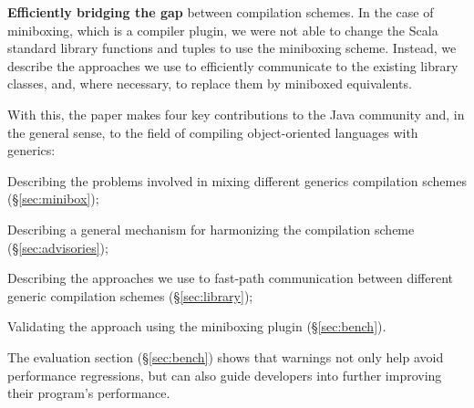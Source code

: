 \textbf{Efficiently bridging the gap} between compilation schemes. In the case of miniboxing, which is a compiler plugin, we were not able to change the Scala standard library functions and tuples to use the miniboxing scheme. Instead, we describe the approaches we use to efficiently communicate to the existing library classes, and, where necessary, to replace them by miniboxed equivalents.

With this, the paper makes four key contributions to the Java community and, in the general sense, to the field of compiling object-oriented languages with generics:

\begin{compactitem}
  \item Describing the problems involved in mixing different generics compilation schemes (\S\ref{sec:minibox});
  \item Describing a general mechanism for harmonizing the compilation scheme (\S\ref{sec:advisories});
  \item Describing the approaches we use to fast-path communication between different generic compilation schemes (\S\ref{sec:library});
  \item Validating the approach using the miniboxing plugin (\S\ref{sec:bench}).
\end{compactitem}

The evaluation section (\S\ref{sec:bench}) shows that warnings not only help avoid performance regressions, but can also guide developers into further improving their program's performance.